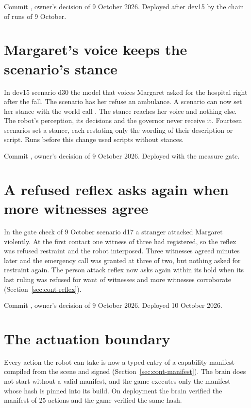 Commit , owner's decision of 9 October 2026.
Deployed after dev15 by the chain of runs of 9 October.

\section{Margaret's voice keeps the scenario's stance}\label{sec:log-stance}

In dev15 scenario d30 the model that voices Margaret asked for the hospital right after the fall.
The scenario has her refuse an ambulance.
A scenario can now set her stance with the world call .
The stance reaches her voice and nothing else.
The robot's perception, its decisions and the governor never receive it.
Fourteen scenarios set a stance, each restating only the wording of their description or script.
Runs before this change used scripts without stances.

Commit , owner's decision of 9 October 2026.
Deployed with the measure gate.

\section{A refused reflex asks again when more witnesses agree}\label{sec:log-reask}

In the gate check of 9 October scenario d17 a stranger attacked Margaret violently.
At the first contact one witness of three had registered, so the reflex was refused restraint and
the robot interposed.
Three witnesses agreed minutes later and the emergency call was granted at three of two, but
nothing asked for restraint again.
The person attack reflex now asks again within its hold when its last ruling was refused for want
of witnesses and more witnesses corroborate (Section~\ref{sec:cont-reflex}).

Commit , owner's decision of 9 October 2026.
Deployed 10 October 2026.

\section{The actuation boundary}\label{sec:log-manifest}

Every action the robot can take is now a typed entry of a capability manifest compiled from the
scene and signed (Section~\ref{sec:cont-manifest}).
The brain does not start without a valid manifest, and the game executes only the manifest whose
hash is pinned into its build.
On deployment the brain verified the manifest of 25 actions and the game verified the same hash.

